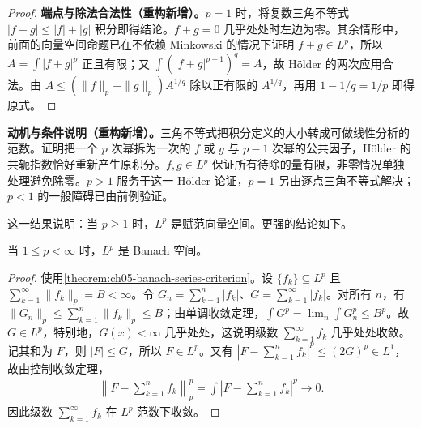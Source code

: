 \documentclass[../../main.tex]{subfiles}
\begin{document}
\begin{proof}
\textbf{端点与除法合法性（重构新增）。}$p=1$ 时，将复数三角不等式 $|f+g|\leqslant|f|+|g|$ 积分即得结论。$f+g=0$ 几乎处处时左边为零。其余情形中，前面的向量空间命题已在不依赖 Minkowski 的情况下证明 $f+g\in L^p$，所以 $A=\int|f+g|^p$ 正且有限；又 $\int(|f+g|^{p-1})^q=A$，故 Hölder 的两次应用合法。由 $A\leqslant(\|f\|_p+\|g\|_p)A^{1/q}$ 除以正有限的 $A^{1/q}$，再用 $1-1/q=1/p$ 即得原式。
\end{proof}
\begin{remark}
\textbf{动机与条件说明（重构新增）。}三角不等式把积分定义的大小转成可做线性分析的范数。证明把一个 $p$ 次幂拆为一次的 $f$ 或 $g$ 与 $p-1$ 次幂的公共因子，Hölder 的共轭指数恰好重新产生原积分。$f,g\in L^p$ 保证所有待除的量有限，非零情况单独处理避免除零。$p>1$ 服务于这一 Hölder 论证，$p=1$ 另由逐点三角不等式解决；$p<1$ 的一般障碍已由前例验证。
\end{remark}
这一结果说明：当 $p\geqslant1$ 时，$L^p$ 是赋范向量空间。更强的结论如下。
\begin{theorem}\label{theorem:ch06-lp-completeness}
当 $1\leqslant p<\infty$ 时，$L^p$ 是 Banach 空间。
\end{theorem}
\begin{proof}
使用\cref{theorem:ch05-banach-series-criterion}。设 $\{f_k\}\subseteq L^p$ 且 $\sum_{k=1}^{\infty}\|f_k\|_p=B<\infty$。令 $G_n=\sum_{k=1}^n|f_k|$、$G=\sum_{k=1}^{\infty}|f_k|$。对所有 $n$，有 $\|G_n\|_p\leqslant\sum_{k=1}^n\|f_k\|_p\leqslant B$；由单调收敛定理，$\int G^p=\lim_n\int G_n^p\leqslant B^p$。故 $G\in L^p$，特别地，$G(x)<\infty$ 几乎处处，这说明级数 $\sum_{k=1}^{\infty}f_k$ 几乎处处收敛。记其和为 $F$，则 $|F|\leqslant G$，所以 $F\in L^p$。又有 $|F-\sum_{k=1}^nf_k|^p\leqslant(2G)^p\in L^1$，故由控制收敛定理，
\begin{align*}
\left\|F-\sum_{k=1}^nf_k\right\|_p^p
=\int\left|F-\sum_{k=1}^nf_k\right|^p\longrightarrow0.
\end{align*}
因此级数 $\sum_{k=1}^{\infty}f_k$ 在 $L^p$ 范数下收敛。
\end{proof}
\end{document}
